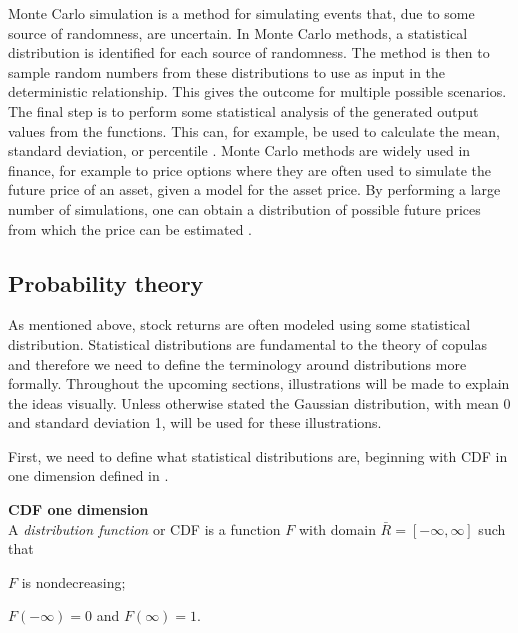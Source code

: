 Monte Carlo simulation is a method for simulating events that, due to some source of randomness, are uncertain. In Monte Carlo methods, a statistical distribution is identified for each source of randomness. The method is then to sample random numbers from these distributions to use as input in the deterministic relationship. This gives the outcome for multiple possible scenarios. The final step is to perform some statistical analysis of the generated output values from the functions. This can, for example, be used to calculate the mean, standard deviation, or percentile . Monte Carlo methods are widely used in finance, for example to price options where they are often used to simulate the future price of an asset, given a model for the asset price. By performing a large number of simulations, one can obtain a distribution of possible future prices from which the price can be estimated . 



\subsection{Probability theory}
As mentioned above, stock returns are often modeled using some statistical distribution. Statistical distributions are fundamental to the theory of copulas and therefore we need to define the terminology around distributions more formally. Throughout the upcoming sections, illustrations will be made to explain the ideas visually. Unless otherwise stated the Gaussian distribution, with mean 0 and standard deviation 1, will be used for these illustrations.

First, we need to define what statistical distributions are, beginning with \gls{CDF} in one dimension defined in .


\begin{definition}\label{def:CDF1d} \textbf{CDF one dimension }  \citet[p.~17]{Nelsen2006}\\
    A \emph{distribution function} or \gls{CDF} is a function $F$ with domain $\bar{R} = [-\infty, \infty]$ such that 
    \begin{compactenum}
        \item $F$ is nondecreasing; 
        \item $F(-\infty)=0$ and $F(\infty)=1$.
    \end{compactenum}
\end{definition}

